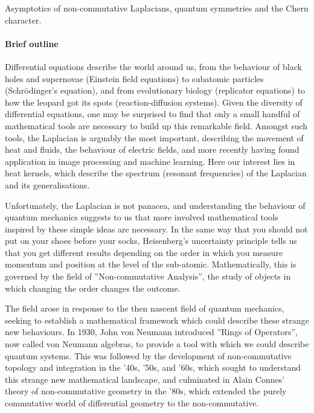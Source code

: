 \documentclass[12pt]{article}
\newcommand{\archeading}[1]{\vspace{.3cm} \noindent{\bfseries #1} \vspace{.1cm}   }
\begin{document}
\parindent=20pt
\pagestyle{empty}
\newpage

\archeading{Project Title} Asymptotics of non-commutative Laplacians, quantum symmetries and the Chern character.

\bigskip\archeading{Project quality and innovation}


\paragraph*{Brief outline} 

Differential equations describe the world around us, from the behaviour of black holes and supernovae (Einstein field equations) to subatomic particles (Schr\"odinger's equation), and from evolutionary biology (replicator equations) to how the leopard got its spots (reaction-diffusion systems). Given the diversity of differential equations, one may be surprised to find that only a small handful of mathematical tools are necessary to build up this remarkable field. Amongst such tools, the Laplacian is arguably the most important, describing the movement of heat and fluids, the behaviour of electric fields, and more recently having found application in image processing and
machine learning. Here our interest lies in heat kernels, which describe the spectrum (resonant frequencies) of the Laplacian and its generalisations.

Unfortunately, the Laplacian is not panacea, and understanding the behaviour of quantum mechanics suggests to us that more involved mathematical tools inspired by these simple ideas are necessary. In the same way that you should not put on your shoes before your socks, Heisenberg's uncertainty principle tells us that you get different results depending on the order in which you measure momentum and position at the level of the sub-atomic. Mathematically, this is governed by the field of ''Non-commutative Analysis'', the study of objects in which changing the order changes the outcome.

The field arose in response to the then nascent field of quantum mechanics, seeking to establish a mathematical framework which could describe these strange new behaviours.
In 1930, John von Neumann introduced ''Rings of Operators'', now called von Neumann
algebras, to provide a tool with which we could describe quantum systems. This was followed by the development of non-commutative topology and integration in the '40s, '50s, and '60s, which sought to understand this strange new mathematical landscape, and culminated in Alain Connes' theory of non-commutative geometry in the '80s, which extended the purely commutative world of differential geometry to the non-commutative.
\end{document}
